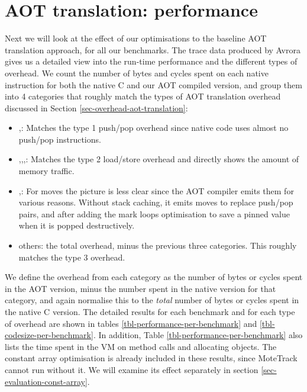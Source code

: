 


\section{AOT translation: performance}
\label{sec-evaluation-aot-translation-performance}

Next we will look at the effect of our optimisations to the baseline AOT translation approach, for all our benchmarks. The trace data produced by Avrora gives us a detailed view into the run-time performance and the different types of overhead. We count the number of bytes and cycles spent on each native instruction for both the native C and our AOT compiled version, and group them into 4 categories that roughly match the types of AOT translation overhead discussed in Section \ref{sec-overhead-aot-translation}:
\begin{itemize}
	\item {},: Matches the type 1 push/pop overhead since native code uses almost no push/pop instructions.
	\item {},,,: Matches the type 2 load/store overhead and directly shows the amount of memory traffic.
	\item {},: For moves the picture is less clear since the AOT compiler emits them for various reasons. Without stack caching, it emits moves to replace push/pop pairs, and after adding the mark loops optimisation to save a pinned value when it is popped destructively.
	\item others: the total overhead, minus the previous three categories. This roughly matches the type 3 overhead.
\end{itemize}

We define the overhead from each category as the number of bytes or cycles spent in the AOT version, minus the number spent in the native version for that category, and again normalise this to the \emph{total} number of bytes or cycles spent in the native C version. The detailed results for each benchmark and for each type of overhead are shown in tables \ref{tbl-performance-per-benchmark} and \ref{tbl-codesize-per-benchmark}. In addition, Table \ref{tbl-performance-per-benchmark} also lists the time spent in the VM on method calls and allocating objects. The constant array optimisation is already included in these results, since MoteTrack cannot run without it. We will examine its effect separately in section \ref{sec-evaluation-const-array}.

